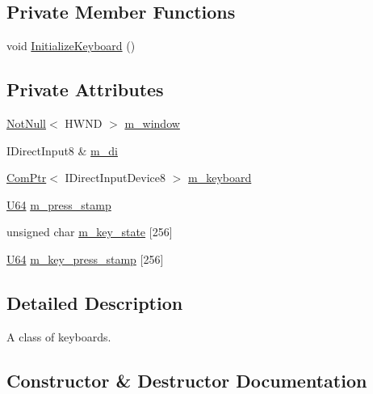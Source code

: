 \subsection*{Private Member Functions}
\begin{DoxyCompactItemize}
\item 
void \hyperlink{classmage_1_1input_1_1_keyboard_1_1_impl_ae4854db552c4651503ec30bb6a477cae}{Initialize\+Keyboard} ()
\end{DoxyCompactItemize}
\subsection*{Private Attributes}
\begin{DoxyCompactItemize}
\item 
\hyperlink{namespacemage_a8769f9d670d6b585ea306cb1062af94b}{Not\+Null}$<$ H\+W\+ND $>$ \hyperlink{classmage_1_1input_1_1_keyboard_1_1_impl_a55d12479108b554c1139bad8318994db}{m\+\_\+window}
\item 
I\+Direct\+Input8 \& \hyperlink{classmage_1_1input_1_1_keyboard_1_1_impl_a87c2eeea3ea7fdaa56cbb6f46235d2e5}{m\+\_\+di}
\item 
\hyperlink{namespacemage_ae74f374780900893caa5555d1031fd79}{Com\+Ptr}$<$ I\+Direct\+Input\+Device8 $>$ \hyperlink{classmage_1_1input_1_1_keyboard_1_1_impl_a933e7f1f86e74c9f761018ef54fe5298}{m\+\_\+keyboard}
\item 
\hyperlink{namespacemage_a6672cf3c861707ce4a3235a3eb43941d}{U64} \hyperlink{classmage_1_1input_1_1_keyboard_1_1_impl_adfe57f2b8e59adae407850d66419bf5a}{m\+\_\+press\+\_\+stamp}
\item 
unsigned char \hyperlink{classmage_1_1input_1_1_keyboard_1_1_impl_a0ac844ac40552bf68ddc12fabc7d3626}{m\+\_\+key\+\_\+state} \mbox{[}256\mbox{]}
\item 
\hyperlink{namespacemage_a6672cf3c861707ce4a3235a3eb43941d}{U64} \hyperlink{classmage_1_1input_1_1_keyboard_1_1_impl_aac27a1a8210f933a9e0598ce8a0fc2cb}{m\+\_\+key\+\_\+press\+\_\+stamp} \mbox{[}256\mbox{]}
\end{DoxyCompactItemize}


\subsection{Detailed Description}
A class of keyboards. 

\subsection{Constructor \& Destructor Documentation}
\hypertarget{classmage_1_1input_1_1_keyboard_1_1_impl_a07a7e889342075f32d2484e8f0a6006f}{}\label{classmage_1_1input_1_1_keyboard_1_1_impl_a07a7e889342075f32d2484e8f0a6006f} 
